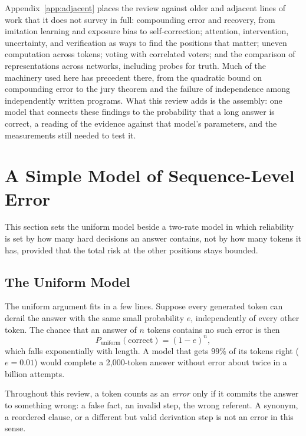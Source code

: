 \documentclass{ieeeaccess}
\begin{document}
Appendix~\ref{app:adjacent} places the review against older and adjacent lines of work that it does not survey in full: compounding error and recovery, from imitation learning and exposure bias to self-correction; attention, intervention, uncertainty, and verification as ways to find the positions that matter; uneven computation across tokens; voting with correlated voters; and the comparison of representations across networks, including probes for truth. Much of the machinery used here has precedent there, from the quadratic bound on compounding error to the jury theorem and the failure of independence among independently written programs. What this review adds is the assembly: one model that connects these findings to the probability that a long answer is correct, a reading of the evidence against that model's parameters, and the measurements still needed to test it.

\section{A Simple Model of Sequence-Level Error}
\label{sec:framework}
This section sets the uniform model beside a two-rate model in which reliability is set by how many hard decisions an answer contains, not by how many tokens it has, provided that the total risk at the other positions stays bounded.

\subsection{The Uniform Model}
The uniform argument fits in a few lines. Suppose every generated token can derail the answer with the same small probability $e$, independently of every other token. The chance that an answer of $n$ tokens contains no such error is then
\begin{equation}
\label{eq:uniform}
P_{\text{uniform}}(\text{correct}) = (1-e)^{n},
\end{equation}
which falls exponentially with length. A model that gets $99\%$ of its tokens right ($e = 0.01$) would complete a 2{,}000-token answer without error about twice in a billion attempts.

Throughout this review, a token counts as an \emph{error} only if it commits the answer to something wrong: a false fact, an invalid step, the wrong referent. A synonym, a reordered clause, or a different but valid derivation step is not an error in this sense.
\end{document}
